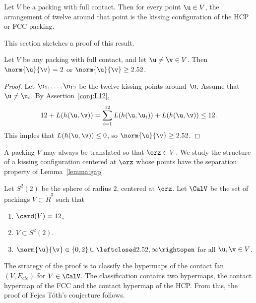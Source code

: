 \begin{theorem}\label{thm:fc} 
  Let $ V$ be a packing with full contact.  Then for every point $
  \u\in V$, the arrangement of twelve around that point is the kissing
  configuration of the HCP or FCC packing.
\end{theorem}
%
%
%

This section  sketches a proof of this result.  


\begin{lemma}[] \label{lemma:gap}
  Let $V$ be any packing with full contact, and let $\u\ne\v\in V$.
  Then $\norm{\u}{\v}=2$ or $\norm{\u}{\v} \ge 2.52$.
\end{lemma}
%
%

\begin{proof} Let $ \u_1,\ldots, \u_{12}$ be the twelve kissing points
  around $\u$.  Assume that $\u\ne \u_i$.  By
  Assertion~\ref{conj:L12},
\[
  12 + L(h( \u, \v)) 
  = \sum_{i=1}^{12} L(h( \u, \u_i)) + L(h( \u, \v)) \le 12.
\]
This imples that $L(h( \u, \v))\le 0$, so $\norm{ \u}{ \v}\ge 2.52$.
\end{proof}

A packing $V$ may always be translated so that $\orz\in V$.  We study
the structure of a kissing configuration centered at $\orz$ whose
points have the separation property of Lemma~\ref{lemma:gap}.

\begin{definition}[$S^2(2)$,~$\CalV$]
  Let $S^2(2)$ be the sphere of radius $2$, centered at $\orz$.  Let
  $\CalV$ be the set of packings $V\subset \ring{R}^3$ such that
\begin{enumerate}\wasitemize 
\item $\card(V) = 12$,
\item $V\subset S^2(2)$.
\item $\norm{\u}{\v} \in \{0,2\}\cup
  \leftclosed2.52,\infty\rightopen$ for all $\u,\v\in V$.
\end{enumerate}\wasitemize 
{}%
%
\end{definition}

The strategy of the proof is to classify the hypermaps of the
contact fan $(V,E_{ctc})$ for $V\in \CalV$.  The classification 
contains two hypermaps, the contact hypermap of the FCC and the contact
hypermap of the HCP.  From this, the proof
of Fejes T\'oth's conjecture  follows.

